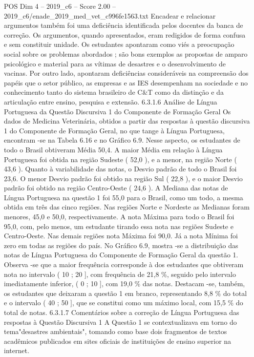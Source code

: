 \begin{textsample}{POS Dim 4 – 2019\_c6 – Score 2.00 – 2019\_c6/enade\_2019\_med\_vet\_c996fe1563.txt}
Encadear e relacionar argumentos também foi uma deficiência identificada pelos docentes da banca de correção.
Os argumentos, quando apresentados, eram redigidos de forma confusa e sem constituir unidade.
Os estudantes apontaram como viés a preocupação social sobre os problemas abordados ; são bons exemplos as propostas de amparo psicológico e material para as vítimas de desastres e o desenvolvimento de vacinas.
Por outro lado, apontaram deficiências consideráveis na compreensão dos papéis que o setor público, as empresas e as IES desempenham na sociedade e no conhecimento tanto do sistema brasileiro de C\&T como da distinção e da articulação entre ensino, pesquisa e extensão. 6.3.1.6 Análise de Língua Portuguesa da Questão Discursiva 1 do Componente de Formação Geral Os dados de Medicina Veterinária, obtidos a partir das respostas à questão discursiva 1 do Componente de Formação Geral, no que tange à Língua Portuguesa, encontram -se na Tabela 6.16 e no Gráfico 6.9.
Nesse aspecto, os estudantes de todo o Brasil obtiveram Média 50,4.
A maior Média em relação à Língua Portuguesa foi obtida na região Sudeste ( 52,0 ), e a menor, na região Norte ( 43,6 ).
Quanto à variabilidade das notas, o Desvio padrão de todo o Brasil foi 23,6.
O menor Desvio padrão foi obtido na região Sul ( 22,8 ), e o maior Desvio padrão foi obtido na região Centro-Oeste ( 24,6 ).
A Mediana das notas de Língua Portuguesa na questão 1 foi 55,0 para o Brasil, como um todo, a mesma obtida em três das cinco regiões.
Nas regiões Norte e Nordeste as Medianas foram menores, 45,0 e 50,0, respectivamente.
A nota Máxima para todo o Brasil foi 95,0, com, pelo menos, um estudante tirando essa nota nas regiões Sudeste e Centro-Oeste.
Nas demais regiões nota Máxima foi 90,0.
Já a nota Mínima foi zero em todas as regiões do país.
No Gráfico 6.9, mostra -se a distribuição das notas de Língua Portuguesa do Componente de Formação Geral da questão 1.
Observa -se que a maior frequência corresponde à dos estudantes que obtiveram nota no intervalo ( 10 ; 20 ], com frequência de 21,8 \%, seguido pelo intervalo imediatamente inferior, ( 0 ; 10 ], com 19,0 \% das notas.
Destacam -se, também, os estudantes que deixaram a questão 1 em branco, representando 8,8 \% do total e o intervalo ( 40 ; 50 ], que se constitui como um máximo local, com 15,5 \% do total de notas. 6.3.1.7 Comentários sobre a correção de Língua Portuguesa das respostas à Questão Discursiva 1 A Questão 1 se contextualizava em torno do tema"desastres ambientais", tomando como base dois fragmentos de textos acadêmicos publicados em sites oficiais de instituições de ensino superior na internet.

\end{textsample}
